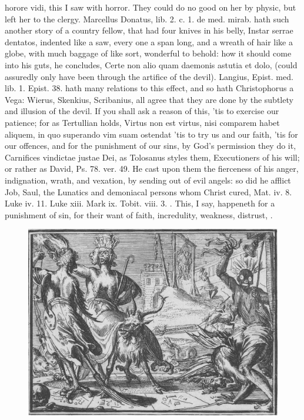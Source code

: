 {horore vidi, this I saw with horror. They could do no good on her by
physic, but left her to the clergy. Marcellus Donatus, lib. 2. c. 1. de
med. mirab. hath such another story of a country fellow, that had four
knives in his belly, Instar serrae dentatos, indented like a saw, every
one a span long, and a wreath of hair like a globe, with much baggage
of like sort, wonderful to behold: how it should come into his guts, he
concludes, Certe non alio quam daemonis astutia et dolo, (could
assuredly only have been through the artifice of the devil). Langius,
Epist. med. lib. 1. Epist. 38. hath many relations to this effect, and
so hath Christophorus a Vega: Wierus, Skenkius, Scribanius, all agree
that they are done by the subtlety and illusion of the devil. If you
shall ask a reason of this, 'tis to exercise our patience; for as
Tertullian holds, Virtus non est virtus, nisi comparem habet
aliquem, in quo superando vim suam ostendat 'tis to try us and our
faith, 'tis for our offences, and for the punishment of our sins, by
God's permission they do it, Carnifices vindictae justae Dei, as
Tolosanus styles them, Executioners of his will; or rather as
David, Ps. 78. ver. 49. He cast upon them the fierceness of his anger,
indignation, wrath, and vexation, by sending out of evil angels: so did
he afflict Job, Saul, the Lunatics and demoniacal persons whom Christ
cured, Mat. iv. 8. Luke iv. 11. Luke xiii. Mark ix. Tobit. viii. 3. \etc{}.
This, I say, happeneth for a punishment of sin, for their want of
faith, incredulity, weakness, distrust, \etc{}.

\begin{figure}[p]
  \centering
  \includegraphics[keepaspectratio,width=\textwidth]{figures/DeHorlende-small.jpg}
  \caption{}
  \label{fig:dehorlende}
\end{figure}

}
